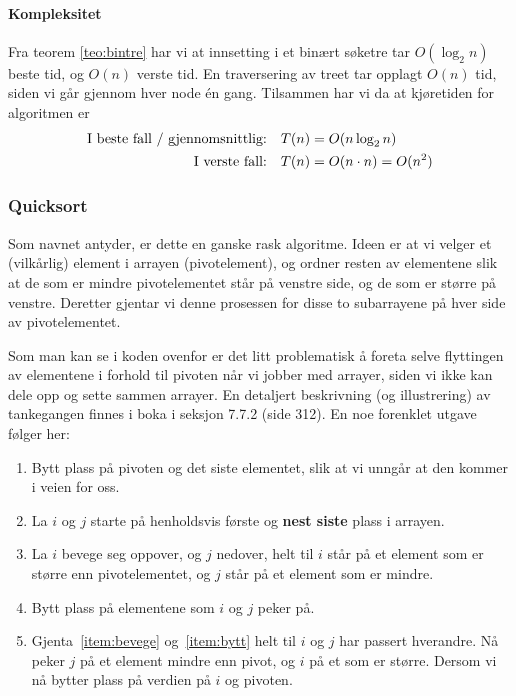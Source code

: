 \paragraph{Kompleksitet}
Fra teorem \ref{teo:bintre} har vi at innsetting i et binært søketre tar $ O(\log_2 n) $ beste tid, og $ O(n) $ verste tid. En traversering av treet tar opplagt $ O(n) $ tid, siden vi går gjennom hver node én gang. Tilsammen har vi da at kjøretiden for algoritmen er 
\begin{align*}
\text{I beste fall / gjennomsnittlig:\quad} & T(n) = O(n\log_2 n)\\
\text{I verste fall:\quad} & T(n) = O(n\cdot n) = O(n^2)
\end{align*}


\subsubsection{Quicksort}
\label{quick}
Som navnet antyder, er dette en ganske rask algoritme.
Ideen er at vi velger et (vilkårlig) element i arrayen (pivotelement), og ordner resten av
elementene slik at de som er mindre pivotelementet står på venstre side, og de
som er større på venstre. Deretter gjentar vi denne prosessen for disse to
subarrayene på hver side av pivotelementet.


Som man kan se i koden ovenfor er det litt problematisk å foreta selve
flyttingen av elementene i forhold til pivoten når vi jobber med arrayer, siden
vi ikke kan dele opp og sette sammen arrayer. En detaljert beskrivning (og
illustrering) av tankegangen finnes i boka i seksjon 7.7.2 (side 312). 
En noe forenklet utgave følger her:
\begin{enumerate}
\item Bytt plass på pivoten og det siste elementet, slik at vi unngår at den
  kommer i veien for oss.
\item La $i$ og $j$ starte på henholdsvis første og \textbf{nest siste} plass i
  arrayen. 
\item\label{item:bevege} La $i$ bevege seg oppover, og $j$ nedover, helt til $i$ står på et
  element som er større enn pivotelementet, og $j$ står på et element som er
  mindre.
\item\label{item:bytt} Bytt plass på elementene som $i$ og $j$ peker på.
\item Gjenta~\ref{item:bevege} og~\ref{item:bytt} helt til $i$ og $j$ har
  passert hverandre. Nå peker $j$ på et element mindre enn pivot, og $i$ på et
  som er større. Dersom vi nå bytter plass på verdien på $i$ og pivoten.
\end{enumerate}

